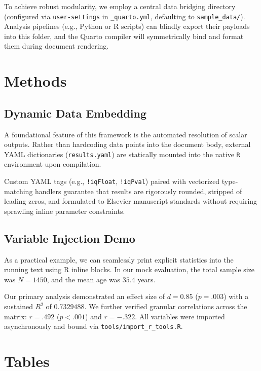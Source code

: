 \documentclass[
  authoryear,
  preprint,
  3p]{elsarticle}
\begin{document}
To achieve robust modularity, we employ a central data bridging directory (configured via \texttt{user-settings} in \texttt{\_quarto.yml}, defaulting to \texttt{sample\_data/}). Analysis pipelines (e.g., Python or R scripts) can blindly export their payloads into this folder, and the Quarto compiler will symmetrically bind and format them during document rendering.

\section{Methods}\label{methods}

\subsection{Dynamic Data Embedding}\label{dynamic-data-embedding}

A foundational feature of this framework is the automated resolution of scalar outputs. Rather than hardcoding data points into the document body, external YAML dictionaries (\texttt{results.yaml}) are statically mounted into the native \texttt{R} environment upon compilation.

Custom YAML tags (e.g., \texttt{!iqFloat}, \texttt{!iqPval}) paired with vectorized type-matching handlers guarantee that results are rigorously rounded, stripped of leading zeros, and formulated to Elsevier manuscript standards without requiring sprawling inline parameter constraints.

\subsection{Variable Injection Demo}\label{variable-injection-demo}

As a practical example, we can seamlessly print explicit statistics into the running text using R inline blocks. In our mock evaluation, the total sample size was \(N = 1450\), and the mean age was \(35.4\) years.

Our primary analysis demonstrated an effect size of \(d = 0.85\) (\(p = .003\)) with a sustained \(R^2\) of \(0.7329488\). We further verified granular correlations across the matrix: \(r = .492\) (\(p < .001\)) and \(r = -.322\). All variables were imported asynchronously and bound via \texttt{tools/import\_r\_tools.R}.

\clearpage

\section{Tables}\label{tables}
\end{document}
